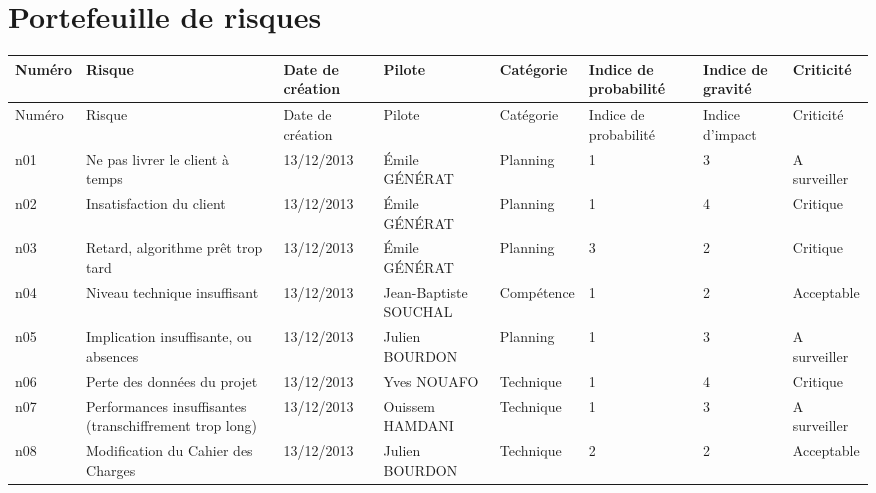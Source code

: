 \documentclass[a4paper,11pt,french]{article}
\begin{document}
\newpage
\section{Portefeuille de risques}

\begin{landscape}

\begin{longtable}{|m{1.5cm}|m{4cm}|m{3cm}|m{3.2cm}|m{2.2cm}|m{2cm}|m{2cm}|m{2.2cm}|}
\hline
\rowcolor[gray]{.8}
Numéro & Risque & Date de création & Pilote & Catégorie \footnotemark[1] & Indice de probabilité & Indice de gravité & Criticité \footnotemark[2] \\ 
\hline
\endfirsthead
\hline
\rowcolor[gray]{.8}
Numéro & Risque & Date de création & Pilote & Catégorie \footnotemark[1] & Indice de probabilité & Indice d'impact & Criticité \footnotemark[2] \\ 
\hline

\endhead
n01 & Ne pas livrer le client à temps & 13/12/2013 & Émile GÉNÉRAT & Planning & 1 & 3 & A surveiller \\
\hline
n02 & Insatisfaction du client & 13/12/2013 & Émile GÉNÉRAT & Planning & 1 & 4 &  Critique \\
\hline
n03 & Retard, algorithme prêt trop tard & 13/12/2013 & Émile GÉNÉRAT & Planning & 3 & 2 & Critique \\
\hline
n04 & Niveau technique insuffisant & 13/12/2013 & Jean-Baptiste SOUCHAL &  Compétence & 1 & 2 & Acceptable \\
\hline
n05 & Implication insuffisante, ou absences & 13/12/2013 & Julien BOURDON & Planning & 1 & 3 & A surveiller \\
\hline
n06 & Perte des données du projet & 13/12/2013 & Yves NOUAFO & Technique & 1 & 4 & Critique \\
\hline
n07 & Performances insuffisantes (transchiffrement trop long) & 13/12/2013 & Ouissem HAMDANI & Technique & 1 & 3 & A surveiller \\
\hline
n08 & Modification du Cahier des Charges & 13/12/2013 & Julien BOURDON & Technique & 2 & 2 & Acceptable \\
\hline

\end{longtable}

\end{landscape}

\newpage
\end{document}
